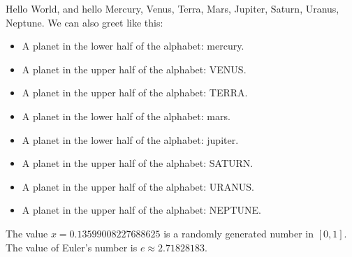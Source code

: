 \documentclass[a4paper]{report}
\begin{document}
    Hello World, and hello Mercury, Venus, Terra, Mars, Jupiter, Saturn, Uranus, Neptune. We can also greet like this:

    \begin{itemize}
    \item A planet in the lower half of the alphabet: mercury.
    \item A planet in the upper half of the alphabet: VENUS.
    \item A planet in the upper half of the alphabet: TERRA.
    \item A planet in the lower half of the alphabet: mars.
    \item A planet in the lower half of the alphabet: jupiter.
    \item A planet in the upper half of the alphabet: SATURN.
    \item A planet in the upper half of the alphabet: URANUS.
    \item A planet in the upper half of the alphabet: NEPTUNE.
    \end{itemize}

    The value $x=0.13599008227688625$ is a randomly generated number in $[0,1]$.
    The value of Euler's number is $e\approx2.71828183$.
\end{document}
